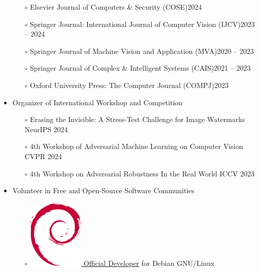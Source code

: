 \documentclass[10pt,margin,line,pifont,palatino,courier]{res}
\begin{document}
\begin{resume}
\begin{itemize}[leftmargin=*]
\begin{itemize}[noitemsep, leftmargin=*]
        \item[$\circ$] Elsevier Journal of Computers \& Security (COSE)\hfill 2024
        \item[$\circ$] Springer Journal: International Journal of Computer Vision (IJCV)\hfill 2023 -- 2024
		\item[$\circ$] Springer Journal of Machine Vision and Application (MVA)\hfill 2020 -- 2023
		\item[$\circ$] Springer Journal of Complex \& Intelligent Systems (CAIS)\hfill 2021 -- 2023
        \item[$\circ$] Oxford University Press: The Computer Journal (COMPJ)\hfill 2023
	\end{itemize}
\item Organizer of International Workshop and Competition
    \begin{itemize}[noitemsep, leftmargin=*]
        \item[$\circ$] Erasing the Invisible: A Stress-Test Challenge for Image Watermarks \hfill NeurIPS 2024
\reversemarginpar{}
        \item[$\circ$] $4$th Workshop of Adversarial Machine Learning on Computer Vision \hfill CVPR 2024
\reversemarginpar{}
        \item[$\circ$] $4$th Workshop on Adversarial Robustness In the Real World \hfill ICCV  2023
\reversemarginpar{}
    \end{itemize}
\item Volunteer in Free and Open-Source Software Communities
    \begin{itemize}[noitemsep, leftmargin=*]
        \item[$\circ$] \href{https://nm.debian.org/person/lumin/}{
            \includegraphics[height=1.2\fontcharht\font`\B]{openlogo-nd-100.png}
            Official Developer} for Debian GNU/Linux

\end{itemize}
\end{itemize}
\end{resume}
\end{document}
